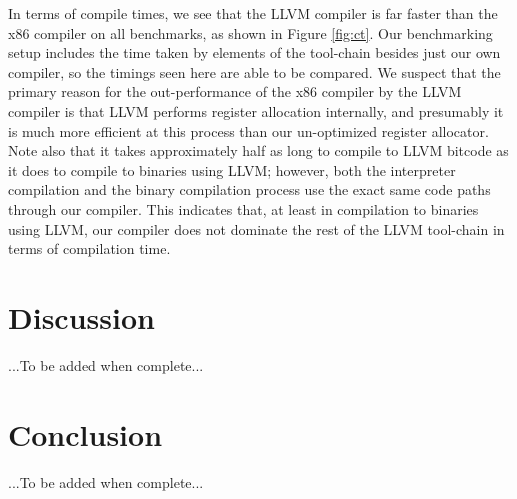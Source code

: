 \documentclass[11pt,twocolumn]{article}
\begin{document}
In terms of compile times, we see that the LLVM compiler is far faster
than the x86 compiler on all benchmarks, as shown in Figure
\ref{fig:ct}. Our benchmarking setup includes the time taken by
elements of the tool-chain besides just our own compiler, so the
timings seen here are able to be compared. We suspect that the primary
reason for the out-performance of the x86 compiler by the LLVM compiler
is that LLVM performs register allocation internally, and presumably
it is much more efficient at this process than our un-optimized
register allocator. Note also that it takes approximately half as long
to compile to LLVM bitcode as it does to compile to binaries using
LLVM; however, both the interpreter compilation and the binary
compilation process use the exact same code paths through our
compiler. This indicates that, at least in compilation to binaries
using LLVM, our compiler does not dominate the rest of the LLVM
tool-chain in terms of compilation time.

\section{Discussion}

...To be added when complete...

\section{Conclusion}

...To be added when complete...

\nocite{*}
\printbibliography
\end{document}
